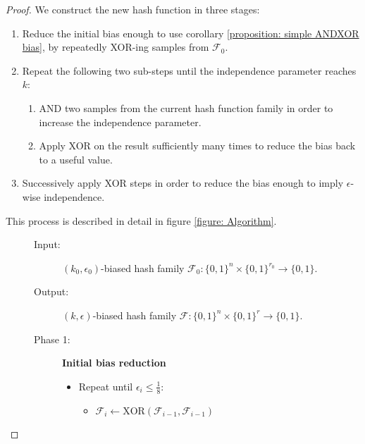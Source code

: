 \documentclass[12pt]{article}
\makeatletter
\newcommand{\removelatexerror}{\let\@latex@error\@gobble}
\newcommand{\zo}[1]{\{0,1\}^{#1}}
\newcommand{\XOR}{\mathrm{XOR} }
\newcommand{\F}{\mathcal{F}}
\makeatother
\begin{document}
	\begin{proof}
		We construct the new hash function in three stages:
		\begin{enumerate}
			
			\item Reduce the initial bias enough to use corollary \ref{proposition: simple ANDXOR bias}, by repeatedly XOR-ing samples from $\F_0$.
			
			\item Repeat the following two sub-steps until the independence parameter reaches $k$:
			\begin{enumerate}
				\item AND two samples from the current hash function family in order to increase the independence parameter.
				\item Apply XOR on the result sufficiently many times to reduce the bias back to a useful value.
			\end{enumerate}
			
			\item Successively apply XOR steps in order to reduce the bias enough to imply $\epsilon$-wise independence.
			
		\end{enumerate}
		This process is described in detail in figure \ref{figure: Algorithm}.
		
		\begin{figure}[H]
			\removelatexerror
			\begin{mdframed}
				
			\begin{description}
				\item[Input:] $(k_0,\epsilon_0)$-biased hash family $\F_0 : \zo{n} \times \zo{r_0} \rightarrow \{0,1\}$.
			\end{description}
			
			\begin{description}
				\item[Output:] $(k,\epsilon)$-biased hash family $\F : \zo{n} \times \zo{r} \rightarrow \{0,1\}$.
			\end{description}
			
			\begin{description}
				\item[Phase 1:] \textbf{Initial bias reduction}
				
				\begin{itemize}
					\item Repeat until $\epsilon_i \leq \frac{1}{8}$:
					\begin{itemize}
						\item $\F_i \leftarrow \XOR(\F_{i-1}, \F_{i-1})$
					\end{itemize}
				\end{itemize}
			\end{description}
			

\end{mdframed}
\end{figure}
\end{proof}
\end{document}
